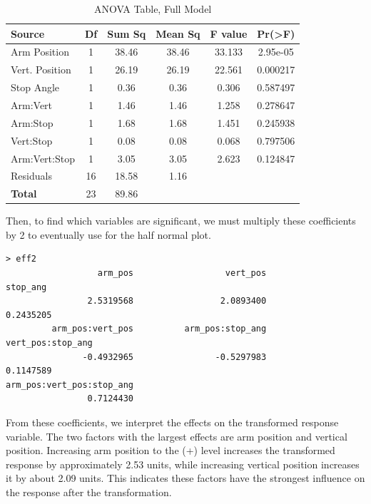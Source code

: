 \documentclass[11pt]{article}
\begin{document}
\begin{table}[H]
\caption{ANOVA Table, Full Model}
\begin{center}
\begin{tabular}{|l|ccccc|}
\hline
\textbf{Source} & \textbf{Df} & \textbf{Sum Sq} & \textbf{Mean Sq} & \textbf{F value} & \textbf{Pr(>F)} \\
\hline
Arm Position          & 1 & 38.46 & 38.46 & 33.133 & 2.95e-05 \\
Vert. Position        & 1 & 26.19  & 26.19  & 22.561 & 0.000217 \\
Stop Angle            & 1 & 0.36    & 0.36    & 0.306  & 0.587497    \\
Arm:Vert             & 1 & 1.46     & 1.46     & 1.258  & 0.278647    \\
Arm:Stop             & 1 & 1.68   & 1.68   & 1.451  & 0.245938     \\
Vert:Stop            & 1 & 0.08   & 0.08   & 0.068  & 0.797506     \\
Arm:Vert:Stop        & 1 & 3.05   & 3.05   & 2.623  & 0.124847    \\
Residuals            & 16 & 18.58 & 1.16   &        &          \\
\hline
\textbf{Total}       & 23 & 89.86 & & & \\
\hline
\end{tabular}
\end{center}
\end{table}

Then, to find which variables are significant, we must multiply these coefficients by 2 to eventually use for the half normal plot.

\begin{verbatim}
> eff2
                  arm_pos                  vert_pos                  stop_ang 
                2.5319568                 2.0893400                 0.2435205 
         arm_pos:vert_pos          arm_pos:stop_ang         vert_pos:stop_ang 
               -0.4932965                -0.5297983                 0.1147589 
arm_pos:vert_pos:stop_ang 
                0.7124430
\end{verbatim}

From these coefficients, we interpret the effects on the transformed response variable. The two factors with the largest effects are arm position and vertical position. Increasing arm position to the (+) level increases the transformed response by approximately 2.53 units, while increasing vertical position increases it by about 2.09 units. This indicates these factors have the strongest influence on the response after the transformation.
\end{document}
